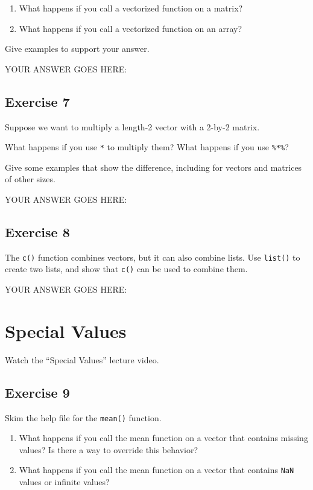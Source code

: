 \documentclass[
]{article}
\begin{document}
\begin{enumerate}
\def\labelenumi{\arabic{enumi}.}
\item
  What happens if you call a vectorized function on a matrix?
\item
  What happens if you call a vectorized function on an array?
\end{enumerate}

Give examples to support your answer.

YOUR ANSWER GOES HERE:

\hypertarget{exercise-7}{%
\subsection{Exercise 7}\label{exercise-7}}

Suppose we want to multiply a length-2 vector with a 2-by-2 matrix.

What happens if you use \texttt{*} to multiply them? What happens if you
use \texttt{\%*\%}?

Give some examples that show the difference, including for vectors and
matrices of other sizes.

YOUR ANSWER GOES HERE:

\hypertarget{exercise-8}{%
\subsection{Exercise 8}\label{exercise-8}}

The \texttt{c()} function combines vectors, but it can also combine
lists. Use \texttt{list()} to create two lists, and show that
\texttt{c()} can be used to combine them.

YOUR ANSWER GOES HERE:

\hypertarget{special-values}{%
\section{Special Values}\label{special-values}}

Watch the ``Special Values'' lecture video.

\hypertarget{exercise-9}{%
\subsection{Exercise 9}\label{exercise-9}}

Skim the help file for the \texttt{mean()} function.

\begin{enumerate}
\def\labelenumi{\arabic{enumi}.}
\item
  What happens if you call the mean function on a vector that contains
  missing values? Is there a way to override this behavior?
\item
  What happens if you call the mean function on a vector that contains
  \texttt{NaN} values or infinite values?
\end{enumerate}
\end{document}
